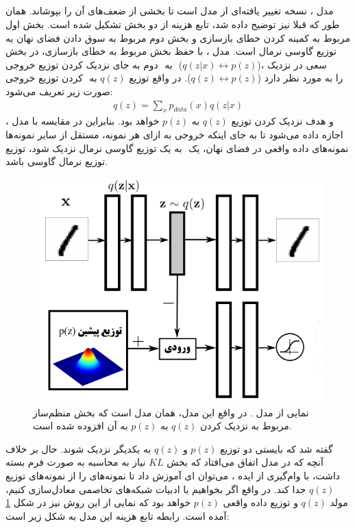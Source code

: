 \subsection{\aae} \label{sec:aae}
مدل ، نسخه تغییر یافته‌ای از مدل \vae{} است تا بخشی از ضعف‌های آن را بپوشاند. همان طور که قبلا نیز توضیح داده شد، تابع هزینه \vae{} از دو بخش تشکیل شده است. بخش اول مربوط به کمینه کردن خطای بازسازی و بخش دوم مربوط به سوق دادن فضای نهان به توزیع گاوسی نرمال است. مدل \aae{}، با حفظ بخش مربوط به خطای بازسازی، در بخش دوم به جای نزدیک کردن توزیع خروجی ‎\encoder{}‎ به  ‎‎‎  ($q(z|x) ‎\leftrightarrow p(z)$)، سعی در نزدیک کردن توزیع   خروجی  ‎‎  را  به \priordist{} مورد نظر دارد
($q(z) ‎\leftrightarrow  p(z)$).
در واقع توزیع \marginal{} $q(z)$ به صورت زیر تعریف می‌شود:
\begin{gather}
	q(z) = \sum_x p_{data}(x) q(z|x)
\end{gather}
و هدف نزدیک کردن توزیع $q(z)$ به $p(z)$ خواهد بود. بنابراین در مقایسه با مدل \vae{}، اجازه داده می‌شود تا به جای اینکه خروجی \encoder{} به ازای هر نمونه، مستقل از سایر نمونه‌ها به یک توزیع گاوسی نرمال نزدیک شود، توزیع ‎\marginal{}‎ نمونه‌های داده واقعی در فضای نهان، یک توزیع نرمال گاوسی باشد.
\begin{figure}[H]
	\centering
	\includegraphics[width=.6\textwidth]{images/aae.png}
	\caption{
		نمایی از مدل  \aae{}. در واقع این مدل، همان مدل \autoencoder{} است که بخش منظم‌ساز مربوط به نزدیک کردن $q(z)$ به $p(z)$ به آن افزوده شده است.
	}
	\label{fig:aae}
\end{figure}
گفته شد که بایستی دو توزیع $p(z)$ و $q(z)$ به یکدیگر نزدیک شوند. حال بر خلاف آنچه که در مدل \vae{} اتفاق می‌افتاد که بخش $KL$ نیاز به محاسبه به صورت فرم بسته داشت، با وام‌گیری از ایده \gan{}، می‌توان \discriminator ‌ای آموزش داد تا نمونه‌های \priordist{} را از نمونه‌های توزیع \marginal
$q(z)$
جدا کند. در واقع اگر بخواهیم با ادبیات شبکه‌های تخاصمی معادل‌سازی کنیم، مولد $q(z)$ و توزیع داده واقعی $p(z)$ خواهد بود که نمایی از این روش نیز در شکل \ref{fig:aae} آمده است. رابطه تابع هزینه این مدل به شکل زیر است:
